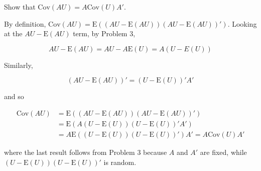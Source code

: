 \documentclass{article}
\newcommand{\E}{\text{E}}
\newcommand{\cov}{\text{Cov}}
\begin{document}
Show that $\cov(AU) = A\cov(U)A'$.

By definition, $\cov(AU) = \E\left((AU-\E(AU))(AU-\E(AU))'\right)$. Looking at the $AU-\E(AU)$ term, by Problem 3,

\[
AU-\E(AU) = AU - A\E(U) = A(U-E(U))
\]

Similarly,

\[
(AU-\E(AU))' = (U-\E(U))'A'
\]

and so

\begin{align*}
\cov(AU) &= \E\left((AU-\E(AU))(AU-\E(AU))'\right)  \\
&= \E\left( A(U - \E(U))(U - \E(U))' A' \right) \\
&= A \E\left((U - \E(U))(U - \E(U))'  \right) A'
= A \cov(U) A'
\end{align*}

where the last result follows from Problem 3 because $A$ and $A'$ are fixed, while $(U - \E(U))(U - \E(U))'$ is random.
\end{document}
